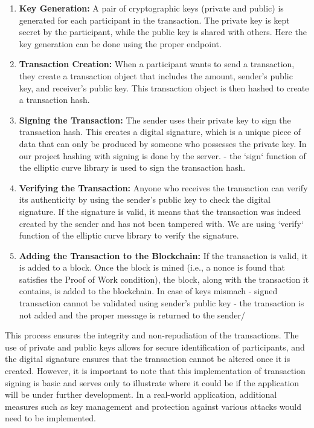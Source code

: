 \documentclass{article}
\begin{document}
\begin{enumerate}
\item \textbf{Key Generation:} A pair of cryptographic keys (private and public) is generated for each participant in the transaction. The private key is kept secret by the participant, while the public key is shared with others. Here the key generation can be done using the proper endpoint.

\item \textbf{Transaction Creation:} When a participant wants to send a transaction, they create a transaction object that includes the amount, sender's public key, and receiver's public key. This transaction object is then hashed to create a transaction hash.

\item \textbf{Signing the Transaction:} The sender uses their private key to sign the transaction hash. This creates a digital signature, which is a unique piece of data that can only be produced by someone who possesses the private key. In our project hashing  with signing is done by the server. - the `sign` function of the elliptic curve library is used to sign the transaction hash.

\item \textbf{Verifying the Transaction:} Anyone who receives the transaction can verify its authenticity by using the sender's public key to check the digital signature. If the signature is valid, it means that the transaction was indeed created by the sender and has not been tampered with. We are using  `verify` function of the elliptic curve library to verify the signature.

\item \textbf{Adding the Transaction to the Blockchain:} If the transaction is valid, it is added to a block. Once the block is mined (i.e., a nonce is found that satisfies the Proof of Work condition), the block, along with the transaction it contains, is added to the blockchain. In case of keys mismach - signed transaction cannot be validated using sender's public key - the transaction is not added and the proper message is returned to the sender/
\end{enumerate}

This process ensures the integrity and non-repudiation of the transactions. The use of private and public keys allows for secure identification of participants, and the digital signature ensures that the transaction cannot be altered once it is created. However, it is important to note that this implementation of transaction signing is basic and serves only to illustrate where it could be if the application will be under further development. In a real-world application, additional measures such as key management and protection against various attacks would need to be implemented.
\end{document}
